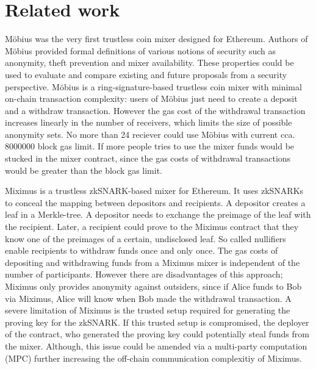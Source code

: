 \documentclass[conference, compsoc]{IEEEtran}
\theoremstyle{definition}
\begin{document}
\section{Related work}
Möbius was the very first trustless coin mixer designed for Ethereum\cite{meiklejohn2018mobius}. Authors of Möbius provided formal definitions of various notions of security such as anonymity, theft prevention and mixer availability. These properties could be used to evaluate and compare existing and future proposals from a security perspective. Möbius is a ring-signature-based trustless coin mixer with minimal on-chain transaction complexity: users of Möbius just need to create a deposit and a withdraw transaction. However the gas cost of the withdrawal transaction increases linearly in the number of receivers, which limits the size of possible anonymity sets. No more than 24 reciever could use Möbius with current cca.$\num[group-separator={,}]{8000000}$  block gas limit. If more people tries to use the mixer funds would be stucked in the mixer contract, since the gas costs of withdrawal transactions would be greater than the block gas limit.     

Miximus is a trustless zkSNARK-based mixer for Ethereum\cite{miximus2018}. It uses zkSNARKs to conceal the mapping between depositors and recipients. A depositor creates a leaf in a Merkle-tree. A depositor needs to exchange the preimage of the leaf with the recipient. Later, a recipient could prove to the Miximus contract that they know one of the preimages of a certain, undisclosed leaf. So called nullifiers enable recipients to withdraw funds once and only once. The gas costs of depositing and withdrawing funds from a Miximus mixer is independent of the number of participants. However there are disadvantages of this approach; Miximus only provides anonymity against outsiders, since if Alice funds to Bob via Miximus, Alice will know when Bob made the withdrawal transaction. A severe limitation of Miximus is the trusted setup required for generating the proving key for the zkSNARK. If this trusted setup is compromised, the deployer of the contract, who generated the proving key could potentially steal funds from the mixer. Although, this issue could be amended via a multi-party computation (MPC) further increasing the off-chain communication complexitiy of Miximus.
\end{document}
